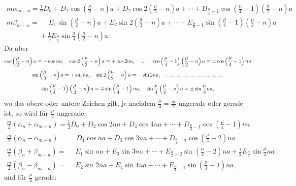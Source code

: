 \begin{landscape}
\[
\begin{array}{l}
m\alpha_{m-n} = \tfrac{1}{2}D_0 + D_1\cos\left(\frac{\mu}{2}-n\right)a + D_2\cos 2\left(\frac{\mu}{2}-n\right)a + \cdots + D_{\frac{\mu}{4}-1}\cos\left(\frac{\mu}{4}-1\right)\left(\frac{\mu}{2}-n\right)a \\[4pt]
m\beta_{m-n} = \phantom{{}={}} E_1\sin\left(\frac{\mu}{2}-n\right)a + E_2\sin 2\left(\frac{\mu}{2}-n\right)a + \cdots + E_{\frac{\mu}{4}-1}\sin\left(\frac{\mu}{4}-1\right)\left(\frac{\mu}{2}-n\right)a \\[4pt]
\phantom{m\beta_{m-n} = {}} + \tfrac{1}{2}E_{\frac{\mu}{4}}\sin\frac{\mu}{4}\left(\frac{\mu}{2}-n\right)a.
\end{array}
\]
Da aber
\[
\begin{gathered}
\cos\left(\frac{\mu}{2}-n\right)a = -\cos na, \quad \cos 2\left(\frac{\mu}{2}-n\right)a = +\cos 2na, \quad \ldots \quad \cos\left(\frac{\mu}{4}-1\right)\left(\frac{\mu}{2}-n\right)a = \pm\cos\left(\frac{\mu}{4}-1\right)na\\[4pt]
\sin\left(\frac{\mu}{2}-n\right)a = +\sin na, \quad \sin 2\left(\frac{\mu}{2}-n\right)a = -\sin 2na, \quad \mathord{.}\,\mathord{.}\,\mathord{.}\,\mathord{.}\,\mathord{.}\,\mathord{.}\,\mathord{.}\,\mathord{.}\,\mathord{.}\,\mathord{.}\,\mathord{.}\,\mathord{.}\,\mathord{.}\,\mathord{.}\,\mathord{.}\,\mathord{.}\,\mathord{.}\,\mathord{.}\,\mathord{.}\,\mathord{.}\,\mathord{.}\,\mathord{.}\,\mathord{.}\,\mathord{.}\,\mathord{.}\\[4pt]
\sin\left(\frac{\mu}{4}-1\right)\left(\frac{\mu}{2}-n\right)a = \mp\sin\left(\frac{\mu}{4}-1\right)na, \quad \sin\frac{\mu}{4}\left(\frac{\mu}{2}-n\right)a = \pm\sin\frac{\mu}{4}na,
\end{gathered}
\]
wo das obere oder untere Zeichen gilt, je nachdem \(\frac{\mu}{4}=\frac{m}{2}\) ungerade oder gerade ist, so wird f\"ur \(\frac{\mu}{4}\) ungerade:
\[
\tag*{5)}
\begin{array}{l}
\frac{m}{2}(\alpha_n+\alpha_{m-n}) = \tfrac{1}{2}D_0 + D_2\cos 2na + D_4\cos 4na + \cdots + D_{\frac{\mu}{4}-1}\cos\left(\frac{\mu}{4}-1\right)na \\[4pt]
\frac{m}{2}(\alpha_n-\alpha_{m-n}) = \phantom{{}={}} D_1\cos na + D_3\cos 3na + \cdots + D_{\frac{\mu}{4}-2}\cos\left(\frac{\mu}{4}-2\right)na \\[4pt]
\frac{m}{2}(\beta_n+\beta_{m-n}) = \phantom{{}={}} E_1\sin na + E_3\sin 3na + \cdots + E_{\frac{\mu}{4}-2}\sin\left(\frac{\mu}{4}-2\right)na + \tfrac{1}{2}E_{\frac{\mu}{4}}\sin\frac{\mu}{4}na \\[4pt]
\frac{m}{2}(\beta_n-\beta_{m-n}) = \phantom{{}={}} E_2\sin 2na + E_4\sin 4na + \cdots + E_{\frac{\mu}{4}-1}\sin\left(\frac{\mu}{4}-1\right)na,
\end{array}
\]
und f\"ur \(\frac{\mu}{4}\) gerade:
\[
\tag*{6)}
\begin{array}{l}

\end{array}\]
\end{landscape}
